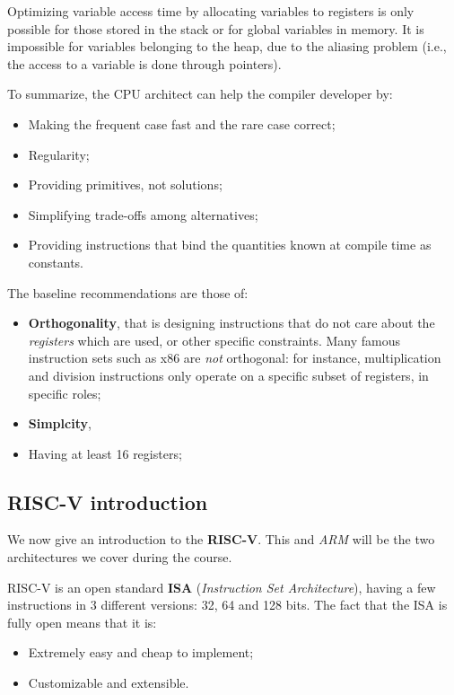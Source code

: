 \documentclass[a4paper,11pt]{article}
\begin{document}
Optimizing variable access time by allocating variables to registers is only possible for those stored in the stack or for global variables in memory.
It is impossible for variables belonging to the heap, due to the aliasing problem (i.e., the access to a variable is done through pointers).

To summarize, the CPU architect can help the compiler developer by:
\begin{itemize}
	\item Making the frequent case fast and the rare case correct;
	\item Regularity;
	\item Providing primitives, not solutions;
	\item Simplifying  trade-offs among alternatives;
	\item Providing instructions that bind the quantities known at compile time as constants.
\end{itemize}

The baseline recommendations are those of:
\begin{itemize}
	\item \textbf{Orthogonality}, that is designing instructions that do not care about the \textit{registers} which are used, or other specific constraints. Many famous instruction sets such as x86 are \textit{not} orthogonal: for instance, multiplication and division instructions only operate on a specific subset of registers, in specific roles;
	\item \textbf{Simplcity},
	\item Having at least 16 registers;
\end{itemize}

\subsection{RISC-V introduction}

We now give an introduction to the \textbf{RISC-V}.
This and \textit{ARM} will be the two architectures we cover during the course.

RISC-V is an open standard \textbf{ISA} (\textit{Instruction Set Architecture}), having a few instructions in 3 different versions: 32, 64 and 128 bits.
The fact that the ISA is fully open means that it is:
\begin{itemize}
	\item Extremely easy and cheap to implement;
	\item Customizable and extensible.
\end{itemize}
\end{document}
